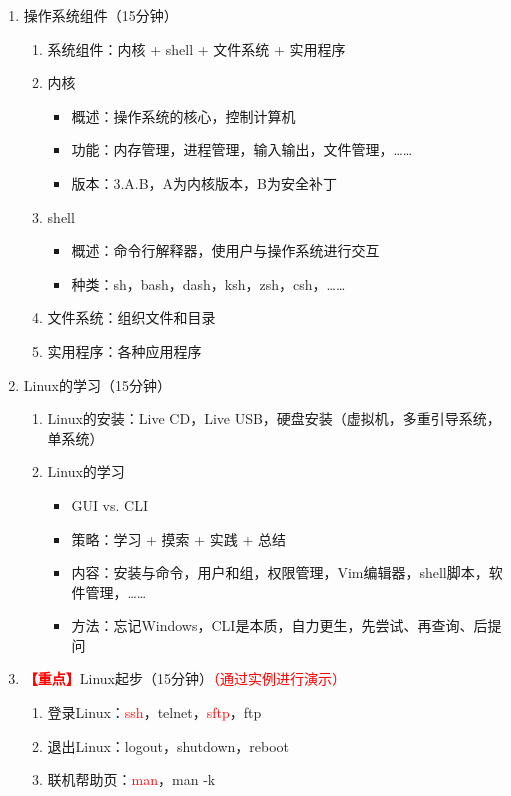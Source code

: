 \documentclass{TIJMUjiaoanLL}
\begin{document}
\begin{enumerate}
  \item 操作系统组件（15分钟）
    \begin{enumerate}
      \item 系统组件：内核 + shell + 文件系统 + 实用程序
      \item 内核
	\begin{itemize}
	  \item 概述：操作系统的核心，控制计算机
	  \item 功能：内存管理，进程管理，输入输出，文件管理，……
	  \item 版本：3.A.B，A为内核版本，B为安全补丁
	\end{itemize}
      \item shell
	\begin{itemize}
	  \item 概述：命令行解释器，使用户与操作系统进行交互
	  \item 种类：sh，bash，dash，ksh，zsh，csh，……
	\end{itemize}
      \item 文件系统：组织文件和目录
      \item 实用程序：各种应用程序
    \end{enumerate}

  \item Linux的学习（15分钟）
    \begin{enumerate}
      \item Linux的安装：Live CD，Live USB，硬盘安装（虚拟机，多重引导系统，单系统）
      \item Linux的学习
	\begin{itemize}
	  \item GUI vs. CLI
	  \item 策略：学习 + 摸索 + 实践 + 总结
	  \item 内容：安装与命令，用户和组，权限管理，Vim编辑器，shell脚本，软件管理，……
	  \item 方法：忘记Windows，CLI是本质，自力更生，先尝试、再查询、后提问
	\end{itemize}
    \end{enumerate}

  \item
    \textcolor{red}{\textbf{【重点】}}Linux起步（15分钟）\textcolor{red}{（通过实例进行演示）}
    \begin{enumerate}
      \item 登录Linux：\textcolor{red}{ssh}，telnet，\textcolor{red}{sftp}，ftp
      \item 退出Linux：logout，shutdown，reboot
      \item 联机帮助页：\textcolor{red}{man}，man -k
    \end{enumerate}


\end{enumerate}
\end{document}
